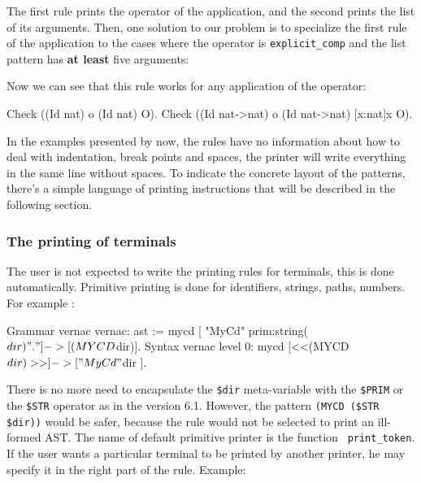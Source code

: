 {The first rule prints the operator of the application, and the second
prints the list of its arguments. Then, one solution to our problem is
to specialize the first rule of the application to the cases where the
operator is \verb+explicit_comp+ and the list pattern has {\bf at
least} five arguments:


Now we can see that this rule works for any application of the
operator:

\begin{coq_example}
Check ((Id nat) o (Id nat) O).
Check ((Id nat->nat) o (Id nat->nat) [x:nat]x O).
\end{coq_example}

In the examples presented by now, the rules have no information about
how to deal with indentation, break points and spaces, the printer
will write everything in the same line without spaces. To indicate the
concrete layout of the patterns, there's a simple language of printing
instructions that will be described in the following section.


\subsubsection{The printing of terminals}
The user is not expected to write the printing rules for terminals,
this is done automatically.  Primitive printing is done for
identifiers, strings, paths, numbers. For example : 

\begin{coq_example*}
Grammar vernac vernac: ast :=
  mycd [ "MyCd" prim:string($dir) "." ] -> [(MYCD $dir)].
Syntax vernac level 0:
  mycd [<<(MYCD $dir)>>] -> [ "MyCd " $dir ].
\end{coq_example*}

There is no more need to encapsulate the \verb+$dir+ meta-variable
with the \verb+$PRIM+ or the \verb+$STR+ operator as in the version
6.1. However, the pattern \verb+(MYCD ($STR $dir))+ would be safer,
because the rule would not be selected to print an ill-formed AST. The
name of default primitive printer is the {\ocaml} function {\tt
print\_token}. If the user wants a particular terminal to be printed
by another printer, he may specify it in the right part of the
rule. Example:

}
